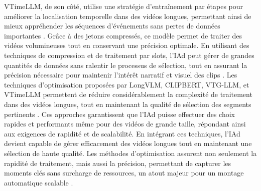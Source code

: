 \documentclass[livre]{udes-genie-these}
\begin{document}
VTimeLLM, de son côté, utilise une stratégie d'entraînement par étapes pour améliorer la localisation temporelle dans des vidéos longues, permettant ainsi de mieux appréhender les séquences d'événements sans pertes de données importantes \cite{huang2024_vtimellm}. Grâce à des jetons compressés, ce modèle permet de traiter des vidéos volumineuses tout en conservant une précision optimale.
En utilisant des techniques de compression et de traitement par slots, l'IAd peut gérer de grandes quantités de données sans ralentir le processus de sélection, tout en assurant la précision nécessaire pour maintenir l'intérêt narratif et visuel des clips \cite{guo2024_vtgllm}\cite{huang2024_vtimellm}.
Les techniques d'optimisation proposées par LongVLM, CLIPBERT, VTG-LLM, et VTimeLLM permettent de réduire considérablement la complexité de traitement dans des vidéos longues, tout en maintenant la qualité de sélection des segments pertinents \cite{weng2024}\cite{lei2021_clipbert}\cite{guo2024_vtgllm}\cite{huang2024_vtimellm}. Ces approches garantissent que l'IAd puisse effectuer des choix rapides et performants même pour des vidéos de grande taille, répondant ainsi aux exigences de rapidité et de scalabilité.
En intégrant ces techniques, l'IAd devient capable de gérer efficacement des vidéos longues tout en maintenant une sélection de haute qualité. Les méthodes d'optimisation assurent non seulement la rapidité de traitement, mais aussi la précision, permettant de capturer les moments clés sans surcharge de ressources, un atout majeur pour un montage automatique scalable \cite{weng2024}\cite{lei2021_clipbert}\cite{guo2024_vtgllm}.
\end{document}
